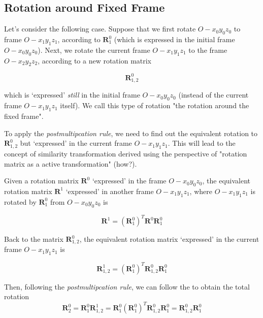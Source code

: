 \documentclass[10pt]{article}
\begin{document}
\subsection{Rotation around Fixed Frame}
Let's consider the following case. Suppose that we first rotate $O- x_{0} y_{0} z_{0}$ to frame $O- x_{1} y_{1} z_{1}$, according to $\boldsymbol{R}_{1}^{0}$ (which is expressed in the initial frame $O- x_{0} y_{0} z_{0}$). Next, we rotate the current frame $O- x_{1} y_{1} z_{1}$ to the frame $O- x_{2} y_{2} z_{2}$,  according to a new rotation matrix

$$
\boldsymbol{R}_{1,2}^0
$$

which is `expressed' \emph{still} in the initial frame $O- x_{0} y_{0} z_{0}$ (instead of the current frame $O- x_{1} y_{1} z_{1}$ itself). We call this type of rotation "the rotation around the fixed frame".




\smallskip
To apply the \emph{postmultipcation rule}, we need to find out the equivalent rotation to $\boldsymbol{R}_{1,2}^0$ but `expressed' in the current frame  $O- x_{1} y_{1} z_{1}$. This will lead to the concept of similarity transformation derived using the perspective of "rotation matrix as a active transformation" (how?).

\medskip

\begin{shaded}
Given a rotation matrix $\boldsymbol{R}^0$ `expressed' in the frame  $O- x_{0} y_{0} z_{0}$, the equivalent rotation matrix $\boldsymbol{R}^1$ `expressed' in another frame $O- x_{1} y_{1} z_{1}$, where $O- x_{1} y_{1} z_{1}$ is rotated by $\boldsymbol{R}_1^0$ from $O- x_{0} y_{0} z_{0}$ is 

$$
\boldsymbol{R}^1=(\boldsymbol{R}_1^0)^T\boldsymbol{R}^0\boldsymbol{R}_1^0
$$

\end{shaded}


Back to the matrix $\boldsymbol{R}_{1,2}^0$, the equivalent rotation matrix `expressed' in the  current frame  $O- x_{1} y_{1} z_{1}$ is 

$$
\boldsymbol{R}_{1,2}^1=(\boldsymbol{R}_1^0)^T\boldsymbol{R}_{1,2}^0\boldsymbol{R}_1^0
$$

Then, following the \emph{postmultipcation rule}, we can follow the   to obtain the total rotation
$$
\boldsymbol{R}_{2}^{0}=\boldsymbol{R}_{1}^{0} \boldsymbol{R}_{1,2}^1=\boldsymbol{R}_{1}^{0} (\boldsymbol{R}_1^0)^T\boldsymbol{R}_{1,2}^0\boldsymbol{R}_1^0=\boldsymbol{R}_{1,2}^0\boldsymbol{R}_1^0
$$
\end{document}
